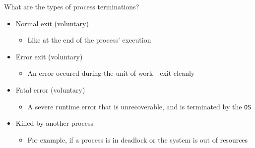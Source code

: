 \documentclass[journal, letterpaper]{IEEEtran}
\begin{document}
\begin{example}{What are the types of process terminations?}
    \begin{itemize}
        \item Normal exit (voluntary)
        \begin{itemize}
            \item Like at the end of the process' execution
        \end{itemize}
        \item Error exit (voluntary)
        \begin{itemize}
            \item An error occured during the unit of work - exit cleanly
        \end{itemize}
        \item Fatal error (voluntary)
        \begin{itemize}
            \item A severe runtime error that is unrecoverable, and is terminated by the \verb|OS|
        \end{itemize}
        \item Killed by another process
        \begin{itemize}
            \item For example, if a process is in deadlock or the system is out of resources
        \end{itemize}
    \end{itemize}
\end{example}
\end{document}

